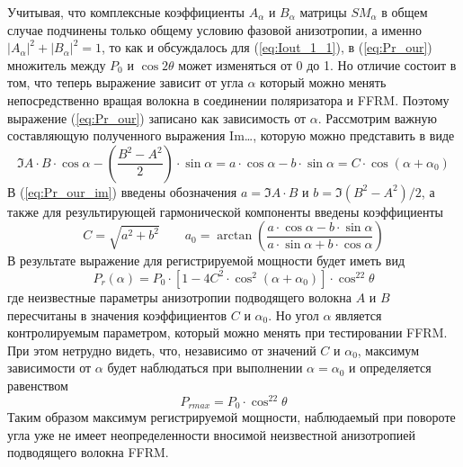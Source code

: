 \documentclass{article}
\begin{document}
Учитывая, что комплексные коэффициенты $A_\alpha$ и $B_\alpha$ матрицы $SM_\alpha$ в общем случае подчинены только общему условию фазовой анизотропии, а именно $|A_\alpha|^2 + |B_\alpha|^2 = 1$, то как и обсуждалось для (\ref{eq:Iout_1_1}), в (\ref{eq:Pr_our}) множитель  между $P_0$ и $\cos2\theta$ может изменяться от 0 до 1.
Но отличие состоит в том, что теперь выражение зависит от угла $\alpha$ который можно менять непосредственно вращая волокна в соединении поляризатора и FFRM.
Поэтому выражение (\ref{eq:Pr_our}) записано как зависимость от $\alpha$.
Рассмотрим важную составляющую полученного выражения Im{…}, которую можно представить в виде 
\begin{equation}
    \label{eq:Pr_our_im}
    \Im{A\cdot B\cdot \cos\alpha-\left( \frac{B^2-A^2}{2} \right)\cdot\sin\alpha} = a\cdot\cos\alpha -b\cdot\sin\alpha=C\cdot\cos(\alpha+\alpha_0)
\end{equation}
В (\ref{eq:Pr_our_im}) введены обозначения $a = \Im{A\cdot B}$ и $b = \Im{(B^2 - A^2)/2}$, а также для результирующей гармонической компоненты введены коэффициенты
\begin{equation}
    C = \sqrt{a^2+b^2} \qquad a_0 = \arctan\left( \frac{a\cdot\cos\alpha - b\cdot \sin \alpha}{a\cdot\sin\alpha + b\cdot\cos\alpha} \right)
\end{equation}
В результате выражение для регистрируемой мощности будет иметь вид  
\begin{equation}
    P_r(\alpha)=P_0\cdot\left[ 1-4 C^2\cdot\cos^2(\alpha+\alpha_0) \right]\cdot\cos^22\theta
\end{equation}
где неизвестные параметры анизотропии подводящего волокна $A$ и $B$ пересчитаны в значения коэффициентов $C$ и $\alpha_0$.
Но угол  $\alpha$ является контролируемым параметром, который можно менять при тестировании FFRM.
При этом нетрудно видеть, что, независимо от значений $C$ и $\alpha_0$, максимум зависимости от $\alpha$ будет наблюдаться при выполнении $\alpha = \alpha_0$ и определяется равенством 
\begin{equation}
    P_{rmax}=P_0\cdot\cos^22\theta
\end{equation}
Таким образом максимум регистрируемой мощности, наблюдаемый при повороте угла уже не имеет неопределенности вносимой неизвестной анизотропией подводящего волокна FFRM.
\end{document}
